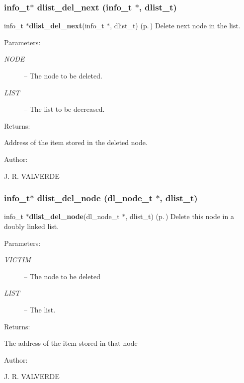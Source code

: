 \subsubsection{\setlength{\rightskip}{0pt plus 5cm}info\_\-t$\ast$ dlist\_\-del\_\-next (info\_\-t $\ast$, {\bf dlist\_\-t})}\label{P__dlist_8h_a7}


info\_\-t $\ast${\bf dlist\_\-del\_\-next}(info\_\-t $\ast$, dlist\_\-t) {\rm (p.\,\pageref{P__dlist_8h_a7})} Delete next node in the list.

\begin{Desc}
\item[Parameters: ]\par
\begin{description}
\item[{\em 
NODE}]-- The node to be deleted. \item[{\em 
LIST}]-- The list to be decreased.\end{description}
\end{Desc}
\begin{Desc}
\item[Returns: ]\par
Address of the item stored in the deleted node.\end{Desc}
\begin{Desc}
\item[Author: ]\par
J. R. VALVERDE \end{Desc}
\subsubsection{\setlength{\rightskip}{0pt plus 5cm}info\_\-t$\ast$ dlist\_\-del\_\-node ({\bf dl\_\-node\_\-t} $\ast$, {\bf dlist\_\-t})}\label{P__dlist_8h_a8}


info\_\-t $\ast${\bf dlist\_\-del\_\-node}(dl\_\-node\_\-t $\ast$, dlist\_\-t) {\rm (p.\,\pageref{P__dlist_8h_a8})} Delete this node in a doubly linked list.

\begin{Desc}
\item[Parameters: ]\par
\begin{description}
\item[{\em 
VICTIM}]-- The node to be deleted \item[{\em 
LIST}]-- The list. \end{description}
\end{Desc}
\begin{Desc}
\item[Returns: ]\par
The address of the item stored in that node\end{Desc}
\begin{Desc}
\item[Author: ]\par
J. R. VALVERDE \end{Desc}
